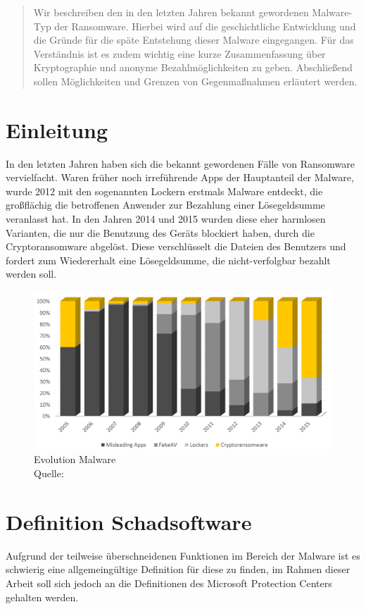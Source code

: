 \begin{abstract}
Wir beschreiben den in den letzten Jahren bekannt gewordenen Malware-Typ der Ransomware. Hierbei wird auf die geschichtliche Entwicklung und die Gründe für die späte Entstehung dieser Malware eingegangen. Für das Verständnis ist es zudem wichtig eine kurze Zusammenfassung über Kryptographie und anonyme Bezahlmöglichkeiten zu geben. Abschließend sollen Möglichkeiten und Grenzen von Gegenmaßnahmen erläutert werden.
\end{abstract}

\section{Einleitung}
\label{sec:einleitung}
	In den letzten Jahren haben sich die bekannt gewordenen Fälle von Ransomware vervielfacht. Waren früher noch irreführende Apps der Hauptanteil der Malware, wurde 2012 mit den sogenannten Lockern erstmals Malware entdeckt, die großflächig die betroffenen Anwender zur Bezahlung einer Lösegeldsumme veranlasst hat. In den Jahren 2014 und 2015 wurden diese eher harmlosen Varianten, die nur die Benutzung des Geräts blockiert haben, durch die Cryptoransomware abgelöst. Diese verschlüsselt die Dateien des Benutzers und fordert zum Wiedererhalt eine Lösegeldsumme, die nicht-verfolgbar bezahlt werden soll.

	\begin{figure}[h!]
		\centering
		\includegraphics[width=\linewidth]{img/ransom-evolution.png}
		\caption{Evolution Malware \\ Quelle: \cite{aids:sdf}}
		\label{fig:ransom-evo}
	\end{figure}

\section{Definition Schadsoftware}
\label{sec:definition}
		Aufgrund der teilweise überschneidenen Funktionen im Bereich der Malware ist es schwierig eine allgemeingültige Definition für diese zu finden, im Rahmen dieser Arbeit soll sich jedoch an die Definitionen des Microsoft Protection Centers \cite{malware_pc} gehalten werden.

